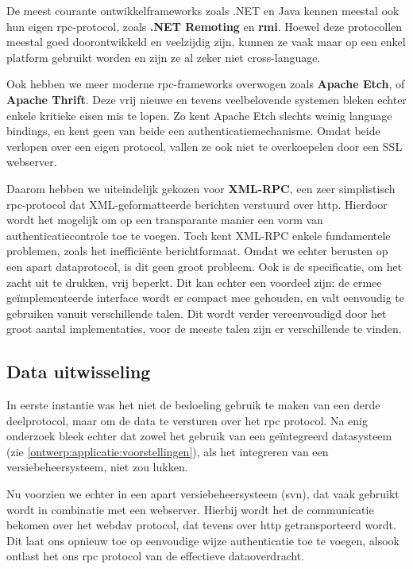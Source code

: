 De meest courante ontwikkelframeworks zoals .NET en Java kennen meestal ook hun eigen \ac{rpc}-protocol, zoals \textbf{.NET Remoting} en \textbf{\ac{rmi}}. Hoewel deze protocollen meestal goed doorontwikkeld en veelzijdig zijn, kunnen ze vaak maar op een enkel platform gebruikt worden en zijn ze al zeker niet cross-language.

Ook hebben we meer moderne \ac{rpc}-frameworks overwogen zoals \textbf{Apache Etch}, of \textbf{Apache Thrift}. Deze vrij nieuwe en tevens veelbelovende systemen bleken echter enkele kritieke eisen mis te lopen. Zo kent Apache Etch slechts weinig language bindings, en kent geen van beide een authenticatiemechanisme. Omdat beide verlopen over een eigen protocol, vallen ze ook niet te overkoepelen door een SSL webserver.

Daarom hebben we uiteindelijk gekozen voor \textbf{XML-RPC}, een zeer simplistisch \ac{rpc}-protocol dat XML-geformatteerde berichten verstuurd over \ac{http}. Hierdoor wordt het mogelijk om op een transparante manier een vorm van authenticatiecontrole toe te voegen. Toch kent XML-RPC enkele fundamentele problemen, zoals het inefficiënte berichtformaat. Omdat we echter berusten op een apart dataprotocol, is dit geen groot probleem. Ook is de specificatie, om het zacht uit te drukken, vrij beperkt. Dit kan echter een voordeel zijn: de ermee geïmplementeerde interface wordt er compact mee gehouden, en valt eenvoudig te gebruiken vanuit verschillende talen. Dit wordt verder vereenvoudigd door het groot aantal implementaties, voor de meeste talen zijn er verschillende te vinden.

\subsection{Data uitwisseling}

In eerste instantie was het niet de bedoeling gebruik te maken van een derde deelprotocol, maar om de data te versturen over het \ac{rpc} protocol. Na enig onderzoek bleek echter dat zowel het gebruik van een geïntegreerd datasysteem (zie \ref{ontwerp:applicatie:voorstellingen}), als het integreren van een versiebeheersysteem, niet zou lukken.

Nu voorzien we echter in een apart versiebeheersysteem (\ac{svn}), dat vaak gebruikt wordt in combinatie met een webserver. Hierbij wordt het de communicatie bekomen over het \ac{webdav} protocol, dat tevens over \ac{http} getransporteerd wordt. Dit laat ons opnieuw toe op eenvoudige wijze authenticatie toe te voegen, alsook ontlast het ons \ac{rpc} protocol van de effectieve dataoverdracht.

